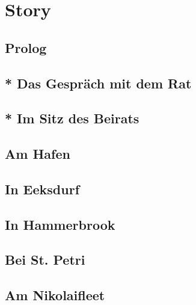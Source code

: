 
\chapter{Story}

\section{\textbf{Prolog}}


\section{\textbf{* Das Gespräch mit dem Rat}}


\section{\textbf{* Im Sitz des Beirats}}


\section{\textbf{Am Hafen}}
\label{Hafen}

\newpage

\section{\textbf{In Eeksdurf}}
\label{xd}

\newpage

\section{\textbf{In Hammerbrook}}
\label{arm}

\newpage

\section{\textbf{Bei St. Petri}}
\label{Petri}

\newpage

\section{\textbf{Am Nikolaifleet}}
\label{Fleet}

